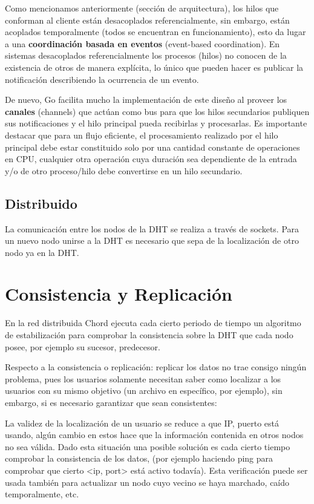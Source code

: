 \documentclass{article}
\begin{document}
Como mencionamos anteriormente (sección de arquitectura), los hilos que conforman al cliente están desacoplados referencialmente, sin embargo, están acoplados temporalmente (todos se encuentran en funcionamiento), esto da lugar a una \textbf{coordinación basada en eventos} (event-based coordination). En sistemas desacoplados referencialmente los procesos (hilos) no conocen de la existencia de otros de manera explícita, lo único que pueden hacer es publicar la notificación describiendo la ocurrencia de un evento.

De nuevo, Go facilita mucho la implementación de este diseño al proveer los \textbf{canales} (channels) que actúan como bus para que los hilos secundarios publiquen sus notificaciones y el hilo principal pueda recibirlas y procesarlas. Es importante destacar que para un flujo eficiente, el procesamiento realizado por el hilo principal debe estar constituido solo por una cantidad constante de operaciones en CPU, cualquier otra operación cuya duración sea dependiente de la entrada y/o de otro proceso/hilo debe convertirse en un hilo secundario.

\subsection{Distribuido}

La comunicación entre los nodos de la DHT se realiza a través de sockets. Para un nuevo nodo unirse a la DHT es necesario que sepa de la localización de otro nodo ya en la DHT.

\section{Consistencia y Replicación}

En la red distribuida Chord ejecuta cada cierto periodo de tiempo un algoritmo de estabilización para comprobar la consistencia sobre la DHT que cada nodo posee, por ejemplo su sucesor, predecesor.

Respecto a la consistencia o replicación: replicar los datos no trae consigo ningún problema, pues los usuarios solamente necesitan saber como localizar a los usuarios con su mismo objetivo (un archivo en específico, por ejemplo), sin embargo, si es necesario garantizar que sean consistentes:

La validez de la localización de un usuario se reduce a que IP, puerto está usando, algún cambio en estos hace que la información contenida en otros nodos no sea válida. Dado esta situación una posible solución es cada cierto tiempo comprobar la consistencia de los datos, (por ejemplo haciendo ping para comprobar que cierto <ip, port> está activo todavía). Esta verificación puede ser usada también para actualizar un nodo cuyo vecino se haya marchado, caído temporalmente, etc.
\end{document}
